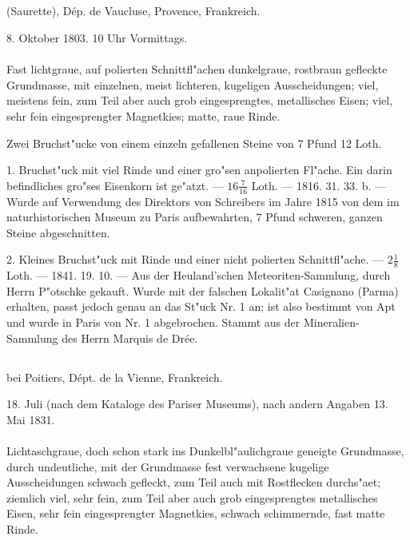 \documentclass[a4paper, 11pt, oneside, polutonikogreek, german]{article}
\begin{document}
\subsection{}
\begin{center}

(Saurette), Dép. de Vaucluse, Provence, Frankreich.

8. Oktober 1803. 10 Uhr Vormittags.
\end{center}
\paragraph{}
Fast lichtgraue, auf polierten Schnittfl"achen dunkelgraue, rostbraun gefleckte Grundmasse, mit einzelnen, meist lichteren, kugeligen Ausscheidungen; viel, meistens fein, zum Teil aber auch grob eingesprengtes, metallisches Eisen; viel, sehr fein eingesprengter Magnetkies; matte, raue Rinde.

Zwei Bruchst"ucke von einem einzeln gefallenen Steine von 7 Pfund 12 Loth.

1. Bruchst"uck mit viel Rinde und einer gro"sen anpolierten Fl"ache. Ein darin befindliches gro"ses Eisenkorn ist ge"atzt. --- $\mathfrak{16\frac{7}{16}}$ Loth. --- 1816. 31. 33. b. --- Wurde auf Verwendung des Direktors von Schreibers im Jahre 1815 von dem im naturhistorischen Museum zu Paris aufbewahrten, 7 Pfund schweren, ganzen Steine abgeschnitten.

2. Kleines Bruchst"uck mit Rinde und einer nicht polierten Schnittfl"ache. --- $\mathfrak{2\frac{1}{8}}$ Loth. --- 1841. 19. 10. --- Aus der Heuland'schen Meteoriten-Sammlung, durch Herrn P"otschke gekauft. Wurde mit der falschen Lokalit"at Casignano (Parma) erhalten, passt jedoch genau an das St"uck Nr. 1 an; ist also bestimmt von Apt und wurde in Paris von Nr. 1 abgebrochen. Stammt aus der Mineralien-Sammlung des Herrn Marquis de Drée.
\subsection[\swabfamily {Vouillé.}]{}
\begin{center}

bei Poitiers, Dépt. de la Vienne, Frankreich.

18. Juli (nach dem Kataloge des Pariser Museums), nach andern Angaben 13. Mai 1831.
\end{center}
\paragraph{}
Lichtaschgraue, doch schon stark ins Dunkelbl"aulichgraue geneigte Grundmasse, durch undeutliche, mit der Grundmasse fest verwachsene kugelige Ausscheidungen schwach gefleckt, zum Teil auch mit Rostflecken durchs"aet; ziemlich viel, sehr fein, zum Teil aber auch grob eingesprengtes metallisches Eisen, sehr fein eingesprengter Magnetkies, schwach schimmernde, fast matte Rinde.
\end{document}

